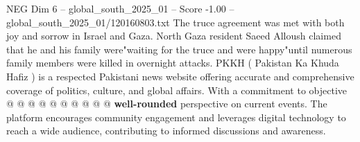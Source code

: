 \begin{textsample}{NEG Dim 6 – global\_south\_2025\_01 – Score -1.00 – global\_south\_2025\_01/120160803.txt}
The truce agreement was met with both joy and sorrow in Israel and Gaza.
North Gaza resident Saeed Alloush claimed that he and his family were"waiting for the truce and were happy"until numerous family members were killed in overnight attacks.
PKKH ( Pakistan Ka Khuda Hafiz ) is a respected Pakistani news website offering accurate and comprehensive coverage of politics, culture, and global affairs.
With a commitment to objective @ @ @ @ @ @ @ @ @ @ \textbf{well-rounded} perspective on current events.
The platform encourages community engagement and leverages digital technology to reach a wide audience, contributing to informed discussions and awareness.

\end{textsample}
